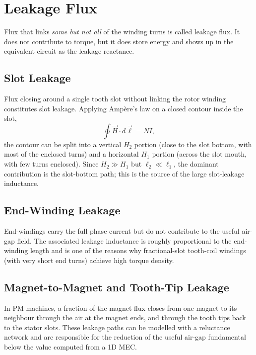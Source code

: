 \documentclass[12pt,a4paper]{article}
\begin{document}
\section{Leakage Flux}
\label{sec:leakage}

Flux that links \emph{some but not all} of the winding turns is called
leakage flux. It does not contribute to torque, but it does store
energy and shows up in the equivalent circuit as the leakage
reactance.

\subsection{Slot Leakage}

Flux closing around a single tooth slot without linking the rotor
winding constitutes slot leakage. Applying Amp\`ere's law on a closed
contour inside the slot,
\begin{equation}
  \oint \vec H\cdot d\vec\ell = NI,
\end{equation}
the contour can be split into a vertical $H_2$ portion (close to the
slot bottom, with most of the enclosed turns) and a horizontal $H_1$
portion (across the slot mouth, with few turns enclosed).
Since $H_2 \gg H_1$ but $\ell_2 \ll \ell_1$, the dominant contribution
is the slot-bottom path; this is the source of the large slot-leakage
inductance.

\subsection{End-Winding Leakage}

End-windings carry the full phase current but do not contribute to the
useful air-gap field. The associated leakage inductance is roughly
proportional to the end-winding length and is one of the reasons why
fractional-slot tooth-coil windings (with very short end turns) achieve
high torque density.

\subsection{Magnet-to-Magnet and Tooth-Tip Leakage}

In PM machines, a fraction of the magnet flux closes from one magnet
to its neighbour through the air at the magnet ends, and through the
tooth tips back to the stator slots. These leakage paths can be
modelled with a reluctance network and are responsible for the
reduction of the useful air-gap fundamental below the value computed
from a 1D MEC.
\end{document}
